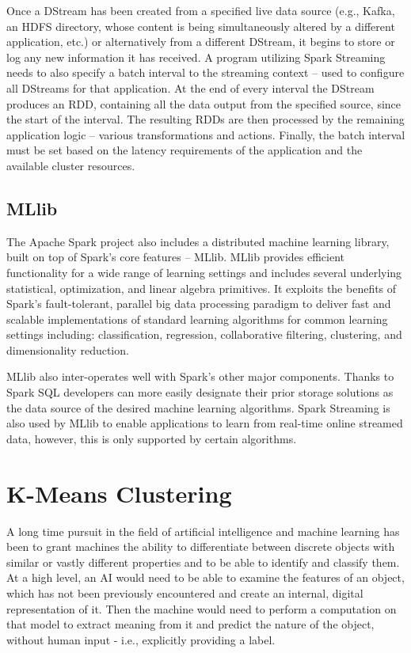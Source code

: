 \documentclass{l4proj}
\begin{document}
Once a DStream has been created from a specified live data source (e.g., Kafka, an HDFS directory, whose content is being simultaneously altered by a different application, etc.) or alternatively from a different DStream, it begins to store or log any new information it has received. A program utilizing Spark Streaming needs to also specify a batch interval to the streaming context -- used to configure all DStreams for that application. At the end of every interval the DStream produces an RDD, containing all the data output from the specified source, since the start of the interval. The resulting RDDs are then processed by the remaining application logic -- various transformations and actions. Finally, the batch interval must be set based on the latency requirements of  the application and the available cluster resources.

\section{MLlib}

The Apache Spark project also includes a distributed machine learning library, built on top of Spark's core features -- MLlib. MLlib provides efficient functionality for a wide range of learning settings and includes several underlying statistical, optimization,
and linear algebra primitives. It exploits the benefits of Spark's fault-tolerant, parallel big data processing paradigm to deliver fast and scalable implementations of standard learning algorithms for common learning settings including:  classification, regression, collaborative filtering, clustering, and dimensionality reduction\cite{MLlib}.

MLlib also inter-operates well with Spark's other major components. Thanks to Spark SQL\cite{SQL} developers can more easily designate their prior storage solutions as the data source of the desired machine learning algorithms. Spark Streaming is also used by MLlib to enable applications to learn from real-time online streamed data, however, this is only supported by certain algorithms.


\chapter{K-Means Clustering}
\label{kmeans}

A long time pursuit in the field of artificial intelligence and machine learning has been to grant machines the ability to differentiate between discrete objects with similar or vastly different properties and to be able to identify and classify them. At a high level, an AI would need to be able to examine the features of an object, which has not been previously encountered and create an internal, digital representation of it. Then the machine would need to perform a computation on that model to extract meaning from it and predict the nature of the object, without human input - i.e., explicitly providing a label.
\end{document}
